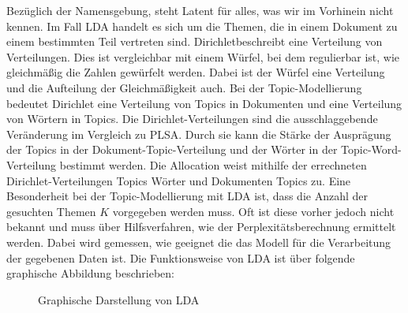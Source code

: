\documentclass[german,version-2020-11]{uzl-thesis}
\begin{document}
Bezüglich der Namensgebung, steht \glqq Latent \grqq für alles, was wir im Vorhinein nicht kennen. Im Fall LDA handelt es sich um die Themen, die in einem Dokument zu einem bestimmten Teil vertreten sind. \glqq Dirichlet\grqq beschreibt eine Verteilung von Verteilungen. Dies ist vergleichbar mit einem Würfel, bei dem regulierbar ist, wie gleichmäßig die Zahlen gewürfelt werden. Dabei ist der Würfel eine Verteilung und die Aufteilung der Gleichmäßigkeit auch. Bei der Topic-Modellierung bedeutet Dirichlet eine Verteilung von Topics in Dokumenten und eine Verteilung von Wörtern in Topics. Die Dirichlet-Verteilungen sind die ausschlaggebende Veränderung im Vergleich zu PLSA. Durch sie kann die Stärke der Ausprägung der Topics in der Dokument-Topic-Verteilung und der Wörter in der Topic-Word-Verteilung bestimmt werden. Die \glqq Allocation \grqq weist mithilfe der errechneten Dirichlet-Verteilungen Topics Wörter und Dokumenten Topics zu. Eine Besonderheit bei der Topic-Modellierung mit LDA ist, dass die Anzahl der gesuchten Themen $K$ vorgegeben werden muss. Oft ist diese vorher jedoch nicht bekannt und muss über Hilfsverfahren, wie der Perplexitätsberechnung ermittelt werden. Dabei wird gemessen, wie geeignet die das Modell für die Verarbeitung der gegebenen Daten ist. Die Funktionsweise von LDA ist über folgende graphische Abbildung beschrieben: \\

\begin{figure}[h]
\centering
{}\caption{Graphische Darstellung von LDA}
\label{fig:ldagraphic}
\end{figure}
\end{document}
